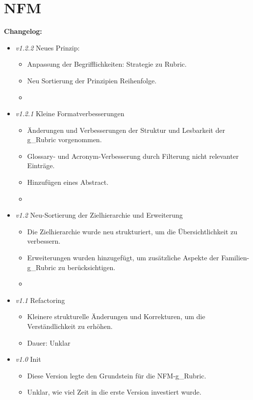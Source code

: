 \chapter{NFM }
\setcounter{section}{0}



\textbf{Changelog:} \\
\begin{itemize}
    \item \textit{v1.2.2} Neues Prinzip: 
    \begin{itemize}
        \item Anpassung der Begrifflichkeiten: Strategie zu Rubric. 
        \item Neu Sortierung der Prinzipien Reihenfolge. 
        \item {}
    \end{itemize}

    \item \textit{v1.2.1} Kleine Formatverbesserungen
    \begin{itemize}
        \item Änderungen und Verbesserungen der Struktur und Lesbarkeit der \gls{g_Rubric} vorgenommen.
        \item Glossary- und Acronym-Verbesserung durch Filterung nicht relevanter Einträge.
        \item Hinzufügen eines Abstract.
        \item {}
    \end{itemize}
    
    \item \textit{v1.2} Neu-Sortierung der Zielhierarchie und Erweiterung
    \begin{itemize}
        \item Die Zielhierarchie wurde neu strukturiert, um die Übersichtlichkeit zu verbessern.
        \item Erweiterungen wurden hinzugefügt, um zusätzliche Aspekte der Familien-\gls{g_Rubric} zu berücksichtigen.
        \item {}
    \end{itemize}
    
    \item \textit{v1.1} Refactoring
    \begin{itemize}
        \item Kleinere strukturelle Änderungen und Korrekturen, um die Verständlichkeit zu erhöhen.
        \item Dauer: Unklar
    \end{itemize}
    
    \item \textit{v1.0} Init
    \begin{itemize}
        \item Diese Version legte den Grundstein für die NFM-\gls{g_Rubric}. 
        \item Unklar, wie viel Zeit in die erste Version investiert wurde.
    \end{itemize}
\end{itemize}
\pagebreak

